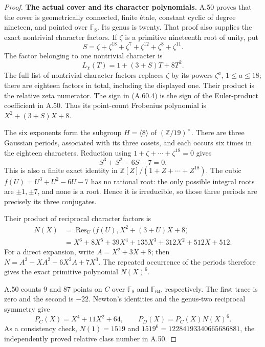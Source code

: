 \begin{proof}
\medskip\noindent\textbf{The actual cover and its character polynomials.}
A.50 proves that the cover is geometrically connected,
finite \'etale, constant cyclic of degree nineteen, and
pointed over $\mathbb F _8$.  Its genus is twenty.
That proof also supplies the exact nontrivial character
factors.  If $\zeta$ is a primitive nineteenth root of
unity, put
\[
 S=\zeta+\zeta^{18}+\zeta^7+\zeta^{12}
                           +\zeta^8+\zeta^{11}.
\]
The factor belonging to one nontrivial character is
\[
                       L_\chi(T)=1+(3+S)T+8T^2.             \tag{A.60.4}
\]
The full list of nontrivial character factors replaces
$\zeta$ by its powers $\zeta^a$, $1\le a\le18$; there
are eighteen factors in total, including the displayed one.
Their product is the relative zeta numerator.
The sign in (A.60.4) is the sign of the Euler-product
coefficient in A.50.  Thus its point-count Frobenius
polynomial is $X^2+(3+S)X+8$.

The six exponents form the subgroup
$H=\langle8\rangle$ of $(\mathbb Z/19)^\times$.
There are three Gaussian periods, associated with its
three cosets, and each occurs six times in the eighteen
characters.  Reduction using
$1+\zeta+\cdots+\zeta^{18}=0$ gives
\[
                             S^3+S^2-6S-7=0.                \tag{A.60.5}
\]
This is also a finite exact identity in
$\mathbb Z[Z]/(1+Z+\cdots+Z^{18})$.
The cubic $f(U)=U^3+U^2-6U-7$ has no rational root:
the only possible integral roots are $\pm1,\pm7$, and
none is a root.  Hence it is irreducible, so those three
periods are precisely its three conjugates.

Their product of reciprocal character factors is
\[
\begin{split}
 N(X)&=\operatorname{Res}_U
             \bigl(f(U),X^2+(3+U)X+8\bigr)\\
     &=X^6+8X^5+39X^4+135X^3+312X^2+512X+512.
\end{split}                                                   \tag{A.60.6}
\]
For a direct expansion, write $A=X^2+3X+8$; then
$N=A^3-XA^2-6X^2A+7X^3$.
The repeated occurrence of the periods therefore gives
the exact primitive polynomial $N(X)^6$.

A.50 counts $9$ and $87$ points on $C$ over
$\mathbb F _8$ and $\mathbb F _{64}$, respectively.
The first trace is zero and the second is $-22$.
Newton's identities and the genus-two reciprocal
symmetry give
\[
 P_C(X)=X^4+11X^2+64,\qquad
                     P_D(X)=P_C(X)N(X)^6.                    \tag{A.60.7}
\]
As a consistency check, $N(1)=1519$ and
$1519^6=12284193340665686881$, the independently proved
relative class number in A.50.


\end{proof}
